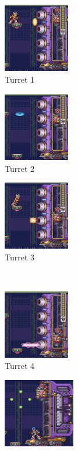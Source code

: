 \begin{figure}[htp]
	\centering
	\begin{subfigure}{0.25\linewidth}
		\centering
		\includegraphics[height=3cm]{figures/X2/Hunter_stages/Serges_tank_1.png}
		\caption{Turret 1}	
	\end{subfigure}
	\begin{subfigure}{0.25\linewidth}
		\centering
		\includegraphics[height=3cm]{figures/X2/Hunter_stages/Serges_tank_2.png}
		\caption{Turret 2}
	\end{subfigure}
	\begin{subfigure}{.25\linewidth}
		\centering
		\includegraphics[height=3cm]{figures/X2/Hunter_stages/Serges_tank_3.png}
		\caption{Turret 3}
	\end{subfigure}\\
	\begin{subfigure}{.25\linewidth}
		\centering
		\includegraphics[height=3cm]{figures/X2/Hunter_stages/Serges_tank_4.png}
		\caption{Turret 4}
	\end{subfigure}
	\begin{subfigure}{.3\linewidth}
		\centering
		\includegraphics[height=3cm]{figures/X2/Hunter_stages/Serges_tank_5.jpg}

\end{subfigure}
\end{figure}
